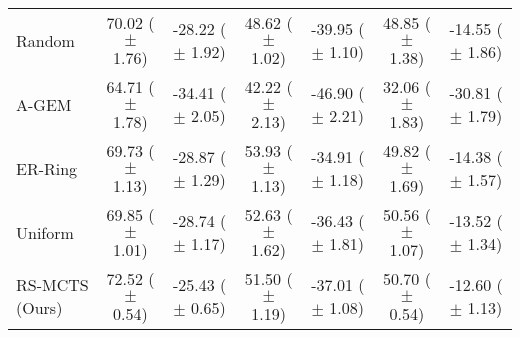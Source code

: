 \begin{table}[t]
{\begin{tabular}{l c c c c c c}
        \midrule 
        Random & 70.02 ($\pm$ 1.76) & -28.22 ($\pm$ 1.92) & 48.62 ($\pm$ 1.02) & -39.95 ($\pm$ 1.10) & 48.85 ($\pm$ 1.38) & -14.55 ($\pm$ 1.86) \\
        A-GEM & 64.71 ($\pm$ 1.78) & -34.41 ($\pm$ 2.05) & 42.22 ($\pm$ 2.13) & -46.90 ($\pm$ 2.21) & 32.06 ($\pm$ 1.83) & -30.81 ($\pm$ 1.79) \\
        ER-Ring & 69.73 ($\pm$ 1.13) & -28.87 ($\pm$ 1.29) & 53.93 ($\pm$ 1.13) & -34.91 ($\pm$ 1.18) & 49.82 ($\pm$ 1.69) & -14.38 ($\pm$ 1.57) \\ 
        Uniform & 69.85 ($\pm$ 1.01) & -28.74 ($\pm$ 1.17) & 52.63 ($\pm$ 1.62) & -36.43 ($\pm$ 1.81) &  50.56 ($\pm$ 1.07) & -13.52 ($\pm$ 1.34) \\ 
        \midrule 
        RS-MCTS (Ours) & 72.52 ($\pm$ 0.54) & -25.43 ($\pm$ 0.65) & 51.50 ($\pm$ 1.19) & -37.01 ($\pm$ 1.08) & 50.70 ($\pm$ 0.54) & -12.60 ($\pm$ 1.13)  \\ 
        \bottomrule
    \end{tabular}
    }
    \vspace{-3mm}
    \label{tab:bwt_efficiency_of_replay_scheduling}
\end{table}

